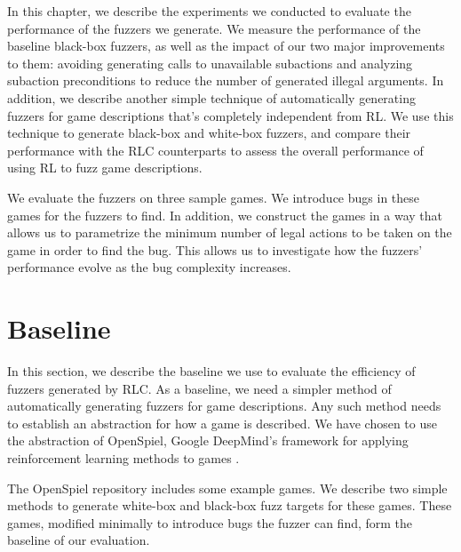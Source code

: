 In this chapter, we describe the experiments we conducted to evaluate the performance of the fuzzers we generate.
We measure the performance of the baseline black-box fuzzers, as well as the impact of our two major improvements to them: 
    avoiding generating calls to unavailable subactions and analyzing subaction preconditions to reduce the number of generated illegal arguments.
In addition, we describe another simple technique of automatically generating fuzzers for game descriptions that's completely independent from RL.
We use this technique to generate black-box and white-box fuzzers, and compare their performance with the RLC counterparts to assess the overall performance of using RL
    to fuzz game descriptions.

We evaluate the fuzzers on three sample games.
We introduce bugs in these games for the fuzzers to find.
In addition, we construct the games in a way that allows us to parametrize the minimum number of legal actions to be taken on the game in order to find the bug.
This allows us to investigate how the fuzzers' performance evolve as the bug complexity increases.

\section{Baseline}
In this section, we describe the baseline we use to evaluate the efficiency of fuzzers generated by RLC.
As a baseline, we need a simpler method of automatically generating fuzzers for game descriptions. Any such method
needs to establish an abstraction for how a game is described. We have chosen to use the abstraction of OpenSpiel, 
Google DeepMind's framework for applying reinforcement learning methods to games \cite{OpenSpiel}.

The OpenSpiel repository includes some example games. We describe two simple methods to generate white-box and black-box fuzz targets for these games.
These games, modified minimally to introduce bugs the fuzzer can find, form the baseline of our evaluation.

